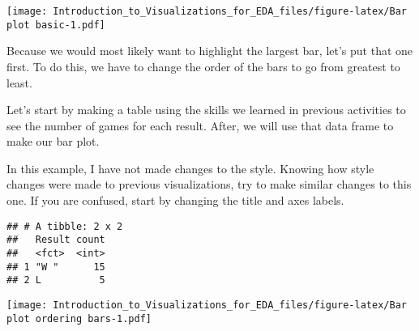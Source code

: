 \documentclass[]{article}
\newenvironment{Shaded}{\begin{snugshade}}{\end{snugshade}}
\newcommand{\DataTypeTok}[1]{\textcolor[rgb]{0.13,0.29,0.53}{#1}}
\newcommand{\KeywordTok}[1]{\textcolor[rgb]{0.13,0.29,0.53}{\textbf{#1}}}
\newcommand{\NormalTok}[1]{#1}
\newcommand{\OperatorTok}[1]{\textcolor[rgb]{0.81,0.36,0.00}{\textbf{#1}}}
\newcommand{\StringTok}[1]{\textcolor[rgb]{0.31,0.60,0.02}{#1}}
\begin{document}
\texttt{[image: Introduction\_to\_Visualizations\_for\_EDA\_files/figure-latex/Bar plot basic-1.pdf]}

Because we would most likely want to highlight the largest bar, let's
put that one first. To do this, we have to change the order of the bars
to go from greatest to least.

Let's start by making a table using the skills we learned in previous
activities to see the number of games for each result. After, we will
use that data frame to make our bar plot.

In this example, I have not made changes to the style. Knowing how style
changes were made to previous visualizations, try to make similar
changes to this one. If you are confused, start by changing the title
and axes labels.

\begin{Shaded}
\end{Shaded}

\begin{verbatim}
## # A tibble: 2 x 2
##   Result count
##   <fct>  <int>
## 1 "W "      15
## 2 L          5
\end{verbatim}

\begin{Shaded}
\end{Shaded}

\texttt{[image: Introduction\_to\_Visualizations\_for\_EDA\_files/figure-latex/Bar plot ordering bars-1.pdf]}
\end{document}
